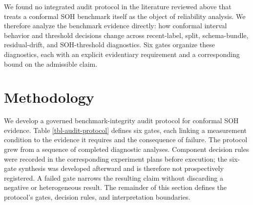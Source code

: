 \documentclass[
  number,
  preprint]{elsarticle}
\begin{document}
We found no integrated audit protocol in the literature reviewed above
that treats a conformal SOH benchmark itself as the object of
reliability analysis. We therefore analyze the benchmark evidence
directly: how conformal interval behavior and threshold decisions change
across recent-label, split, schema-bundle, residual-drift, and
SOH-threshold diagnostics. Six gates organize these diagnostics, each
with an explicit evidentiary requirement and a corresponding bound on
the admissible claim.

\section{Methodology}\label{sec-methodology}

We develop a governed benchmark-integrity audit protocol for conformal
SOH evidence. Table \ref{tbl-audit-protocol} defines six gates, each
linking a measurement condition to the evidence it requires and the
consequence of failure. The protocol grew from a sequence of completed
diagnostic analyses. Component decision rules were recorded in the
corresponding experiment plans before execution; the six-gate synthesis
was developed afterward and is therefore not prospectively registered. A
failed gate narrows the resulting claim without discarding a negative or
heterogeneous result. The remainder of this section defines the
protocol's gates, decision rules, and interpretation boundaries.
\end{document}
